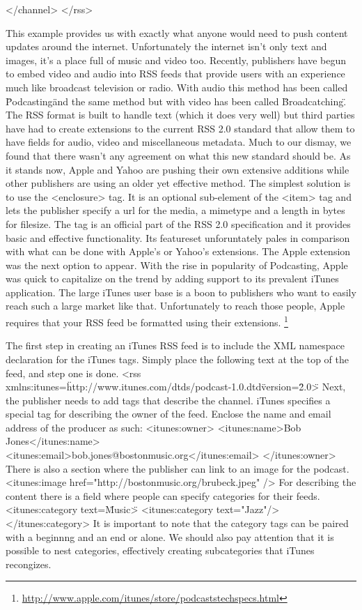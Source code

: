 \documentclass[a4paper,12pt]{report}
\begin{document}
  </channel>
</rss>

This example provides us with exactly what anyone would need to push content updates around the internet.
Unfortunately the internet isn't only text and images, it's a place full of music and video too.
Recently, publishers have begun to embed video and audio into RSS feeds that provide users with an experience much like broadcast television or radio.
With audio this method has been called \"Podcasting\" and the same method but with video has been called \"Broadcatching\".
The RSS format is built to handle text (which it does very well) but third parties have had to create extensions to the current RSS 2.0 standard that allow them to have fields for audio, video and miscellaneous metadata.
Much to our dismay, we found that there wasn't any agreement on what this new standard should be.
As it stands now, Apple and Yahoo are pushing their own extensive additions while other publishers are using an older yet effective method.
The simplest solution is to use the <enclosure> tag.
It is an optional sub-element of the <item> tag and lets the publisher specify a url for the media, a mimetype and a length in bytes for filesize.
The tag is an official part of the RSS 2.0 specification and it provides basic and effective functionality.
Its featureset unforuntately pales in comparison with what can be done with Apple's or Yahoo's extensions.
The Apple extension was the next option to appear.
With the rise in popularity of Podcasting, Apple was quick to capitalize on the trend by adding support to its prevalent iTunes application.
The large iTunes user base is a boon to publishers who want to easily reach such a large market like that.
Unfortunately to reach those people, Apple requires that your RSS feed be formatted using their extensions. \footnote{\url{http://www.apple.com/itunes/store/podcaststechspecs.html}}

The first step in creating an iTunes RSS feed is to include the XML namespace declaration for the iTunes tags.
Simply place the following text at the top of the feed, and step one is done.
<rss xmlns:itunes=\"http://www.itunes.com/dtds/podcast-1.0.dtd\" version=\"2.0\">
Next, the publisher needs to add tags that describe the channel.
iTunes specifies a special tag for describing the owner of the feed.
Enclose the name and email address of the producer as such:
  <itunes:owner>
    <itunes:name>Bob Jones</itunes:name>
    <itunes:email>bob.jones@bostonmusic.org</itunes:email>
  </itunes:owner>
There is also a section where the publisher can link to an image for the podcast.
   <itunes:image href="http://bostonmusic.org/brubeck.jpeg" />
For describing the content there is a field where people can specify categories for their feeds.
	<itunes:category text=\"Music\">
      <itunes:category text="Jazz"/>
   </itunes:category>
It is important to note that the category tags can be paired with a beginnng and an end or alone.
We should also pay attention that it is possible to nest categories, effectively creating subcategories that iTunes recongizes.
\end{document}
